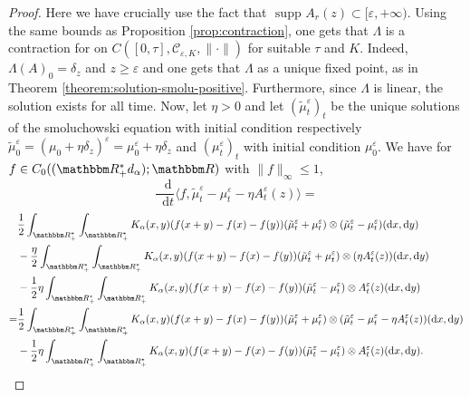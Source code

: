 \documentclass[a4paper,11pt, reqno]{amsart}
\newcommand{\cC}{\mathcal{C}}	\newcommand{\CC}{\mathbbm{C}}
\newcommand{\eps}{\varepsilon}
\newcommand{\dd}{\mathop{}\!\mathrm{d}}
\newcommand{\1}{\mathbbm{1}}
\theoremstyle{plain}
\theoremstyle{definition}
\begin{document}
\begin{proof}
  Here we have crucially use the fact that $ \text{ supp } A_r (z) \subset
  [\eps, + \infty)$. Using the same bounds as Proposition
  \ref{prop:contraction}, one gets that $\Lambda$ is a contraction for on $C
  ([0, \tau], \cC_{\eps, K}, \| \cdot \|)$ for suitable
  $\tau$ and $K$. Indeed, $\Lambda (A)_0 = \delta_z$ and $z \ge
  \eps$ and one gets that $\Lambda$ as a unique fixed point, as in
  Theorem \ref{theorem:solution-smolu-positive}. Furthermore, since $\Lambda$
  is linear, the solution exists for all time. Now, let $\eta > 0$ and let
  $(\tilde{\mu}^{\eps}_t)_t$ be the unique solutions of the
  smoluchowski equation with initial condition respectively
  $\tilde{\mu}^{\eps}_0 = (\mu_0 + \eta \delta_z)^{\eps} =
  \mu_0^{\eps} + \eta \delta_z$ and $(\mu^{\eps}_t)_t$ with
  initial condition $\mu^{\eps}_0$. We have for $f \in C_0
  ((\RR_+^{\ast} d_{\alpha}) ; \RR)$ with $\| f \|_{\infty}
  \le 1$,
  \[ \frac{\dd}{\dd t} \langle f, \tilde{\mu}^{\eps}_t -
     \mu^{\eps}_t - \eta A^{\eps}_t (z) \rangle = \]
  \begin{align*}
    & \frac{1}{2} \int_{\RR_+^{\ast}} \int_{\RR_+^{\ast}}
    K_{\alpha} (x, y) (f (x + y) - f (x) - f (y)) (\tilde{\mu}^{\eps}_t
    + \mu^{\eps}_t) \otimes (\tilde{\mu}^{\eps}_t -
    \mu^{\eps}_t) (\dd x, \dd y)\\
    & - \frac{\eta}{2} \int_{\RR_+^{\ast}} \int_{\RR_+^{\ast}}
    K_{\alpha} (x, y) (f (x + y) - f (x) - f (y)) (\tilde{\mu}^{\eps}_t
    + \mu^{\eps}_t) \otimes (\eta A_t^{\eps} (z)) (\dd x,
    \dd y)\\
    & - \frac{1}{2} \eta \int_{\RR_+^{\ast}}
    \int_{\RR_+^{\ast}} K_{\alpha} (x, y) (f (x + y) - f (x) - f (y))
    (\tilde{\mu}^{\eps}_t - \mu^{\eps}_t) \otimes
    A_t^{\eps} (z) (\dd x, \dd y)\\
    = & \frac{1}{2} \int_{\RR_+^{\ast}} \int_{\RR_+^{\ast}}
    K_{\alpha} (x, y) (f (x + y) - f (x) - f (y)) (\tilde{\mu}^{\eps}_t
    + \mu^{\eps}_t) \otimes (\tilde{\mu}^{\eps}_t -
    \mu^{\eps}_t - \eta A^{\eps}_t (z)) (\dd x, \dd y)\\
    & - \frac{1}{2} \eta \int_{\RR_+^{\ast}}
    \int_{\RR_+^{\ast}} K_{\alpha} (x, y) (f (x + y) - f (x) - f (y))
    (\tilde{\mu}^{\eps}_t - \mu^{\eps}_t) \otimes
    A_t^{\eps} (z) (\dd x, \dd y) .
  \end{align*}
  

\end{proof}
\end{document}
